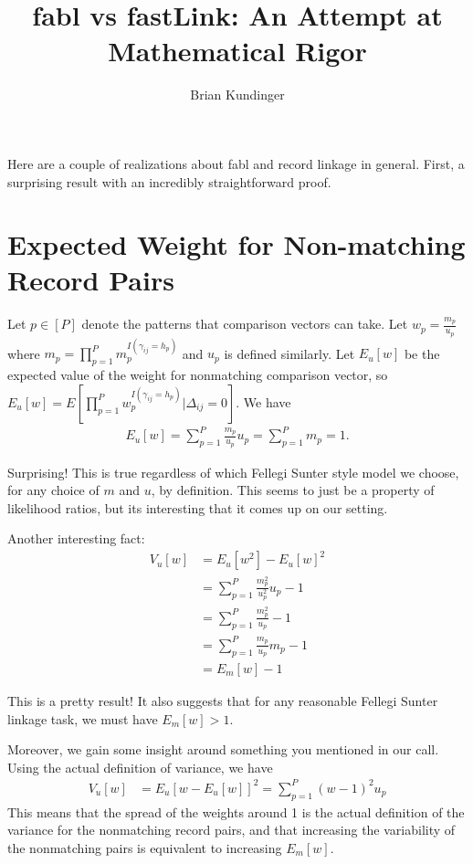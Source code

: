 \documentclass[12pt,letterpaper]{article}
\title{fabl vs fastLink: An Attempt at Mathematical Rigor}
\author{Brian Kundinger}
\newcommand{\1}[1]{\mathbb{I}\!\left[#1\right]} %
\def\spacingset#1{\renewcommand{\baselinestretch}%
  {#1}\small\normalsize} \spacingset{1}
\begin{document}
\maketitle
\spacingset{1.5}

Here are a couple of realizations about fabl and record linkage in general. First, a surprising result with an incredibly straightforward proof. 

\section{Expected Weight for Non-matching Record Pairs}

Let $p \in [P]$ denote the patterns that comparison vectors can take. Let $w_p = \frac{m_p}{u_p}$ where $m_p = \prod_{p = 1}^P m_p ^ {I(\gamma_{ij} = h_p)}$ and $u_p$ is defined similarly. Let $E_u[w]$ be the expected value of the weight for nonmatching comparison vector, so $E_u[w] = E\left[\prod_{p = 1}^P w_p ^ {I(\gamma_{ij} = h_p)} | \Delta_{ij} = 0 \right]$. We have 
\begin{align*}
	E_u[w] = \sum_{p = 1}^P \frac{m_p}{u_p} u_p = \sum_{p = 1}^P m_p = 1.
\end{align*}

Surprising! This is true regardless of which Fellegi Sunter style model we choose, for any choice of $m$ and $u$, by definition. This seems to just be a property of likelihood ratios, but its interesting that it comes up on our setting.

Another interesting fact:
\begin{align*}
	V_u[w] &= E_u[w^2] - E_u[w]^2 \\
	&= \sum_{p=1}^P \frac{m_p^2}{u_p^2} u_p - 1  \\
	&= \sum_{p=1}^P \frac{m_p^2}{u_p} - 1 \\
	&= \sum_{p=1}^P \frac{m_p}{u_p}m_p - 1 \\
	&= E_m[w] - 1
\end{align*}

This is a pretty result! It also suggests that for any reasonable Fellegi Sunter linkage task, we must have $E_m[w] > 1$.

Moreover, we gain some insight around something you mentioned in our call. Using the actual definition of variance, we have
\begin{align*}
	V_u[w] &= E_u[w - E_u[w]]^2 = \sum_{p=1}^P(w - 1)^2 u_p
\end{align*}
This means that the spread of the weights around 1 is the actual definition of the variance for the nonmatching record pairs, and that increasing the variability of the nonmatching pairs is equivalent to increasing $E_m[w]$. 
\end{document}
